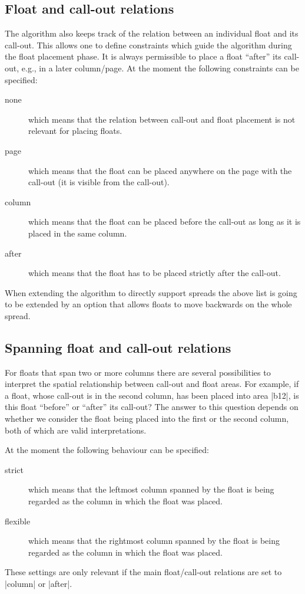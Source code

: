 \documentclass[twocolumn]{article}
\begin{document}
\subsection{Float and call-out relations} \label{fl-callout-relations}

The algorithm also keeps track of the relation between an individual
float and its call-out. This allows one to define constraints which
guide the algorithm during the float placement phase. It is always
permissible to place a float ``after'' its call-out, e.g., in a later
column/\allowbreak page. At the moment the following constraints can
be specified:
\begin{description}
\item[none] which means that the relation between call-out and float
placement is not relevant for placing floats.
\item[page] which means that the float can be placed anywhere on the
page with the call-out (it is visible from the call-out).
\item[column] which means that the float can be placed before the
call-out as long as it is placed in the same column.
\item[after] which means that the float has to be placed strictly
after the call-out.
\end{description}
When extending the algorithm to directly support spreads the
above list is going to be extended by an option that allows floats to
move backwards on the whole spread.




\subsection{Spanning float and call-out relations} \label{fl-span-relation}

For floats that span two or more columns there are several
possibilities to interpret the spatial relationship between call-out
and float areas. For example, if a float, whose call-out is in the
second column, has been placed into area |b12|, is this float
``before'' or ``after'' its call-out? The answer to this question
depends on whether we consider the float being placed into the first
or the second column, both of which are valid interpretations.

At the moment the following behaviour can be specified:
\begin{description}
\item[strict] which means that the leftmost column spanned
  by the float is being regarded as the column in which the float was placed.
\item[flexible] which means that the rightmost column spanned 
  by the float is being regarded as the column in which the float was placed.
\end{description}
These settings are only relevant if the main float/call-out relations
are set to |column| or |after|.
\end{document}
